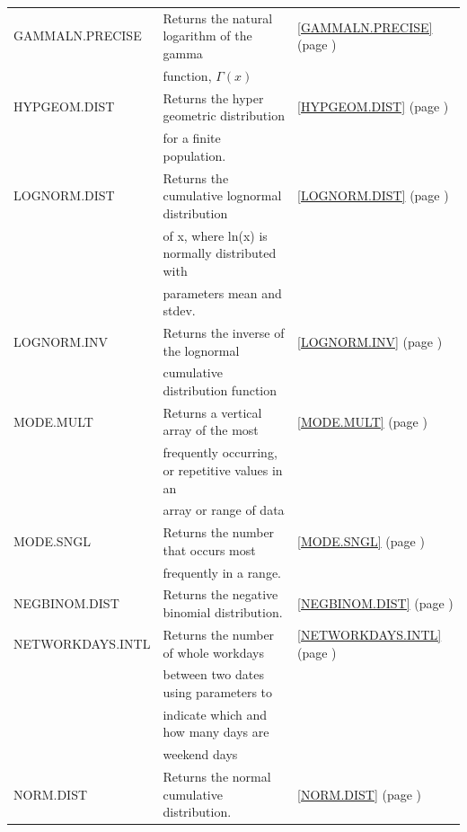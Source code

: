 \begin{center}
\begin{longtable}{l l l }
		GAMMALN.PRECISE & Returns the natural logarithm of the gamma  &  \ref{GAMMALN.PRECISE} (page \pageref{GAMMALN.PRECISE}) \index{Spreadsheet Functions!GAMMALN.PRECISE} \\
		& function, $\Gamma(x)$ &   \\
		HYPGEOM.DIST & Returns the hyper geometric distribution &  \ref{HYPGEOM.DIST} (page \pageref{HYPGEOM.DIST}) \index{Spreadsheet Functions!HYPGEOM.DIST} \\
		& for a finite population. &   \\
		LOGNORM.DIST & Returns the cumulative lognormal distribution  &  \ref{LOGNORM.DIST} (page \pageref{LOGNORM.DIST}) \index{Spreadsheet Functions!LOGNORM.DIST} \\
		& of x, where ln(x) is normally distributed with &   \\
		& parameters mean and stdev. &   \\
		LOGNORM.INV & Returns the inverse of the lognormal  &  \ref{LOGNORM.INV} (page \pageref{LOGNORM.INV}) \index{Spreadsheet Functions!LOGNORM.INV } \\
		& cumulative distribution function &   \\
		MODE.MULT & Returns a vertical array of the most &  \ref{MODE.MULT} (page \pageref{MODE.MULT}) \index{Spreadsheet Functions!MODE.MULT} \\
		& frequently occurring, or repetitive values in an &   \\
		& array or range of data &   \\
		MODE.SNGL & Returns the number that occurs most &  \ref{MODE.SNGL} (page \pageref{MODE.SNGL}) \index{Spreadsheet Functions!MODE.SNGL} \\
		& frequently in a range. &   \\
		NEGBINOM.DIST & Returns the negative binomial distribution. &  \ref{NEGBINOM.DIST} (page \pageref{NEGBINOM.DIST}) \index{Spreadsheet Functions!NEGBINOM.DIST} \\
		NETWORKDAYS.INTL & Returns the number of whole workdays &  \ref{NETWORKDAYS.INTL} (page \pageref{NETWORKDAYS.INTL}) \index{Spreadsheet Functions!NETWORKDAYS.INTL} \\
		& between two dates using parameters to &   \\
		& indicate which and how many days are  &   \\
		& weekend days &   \\
		NORM.DIST & Returns the normal cumulative distribution. &  \ref{NORM.DIST} (page \pageref{NORM.DIST}) \index{Spreadsheet Functions!NORM.DIST } \\

\end{longtable}
\end{center}

